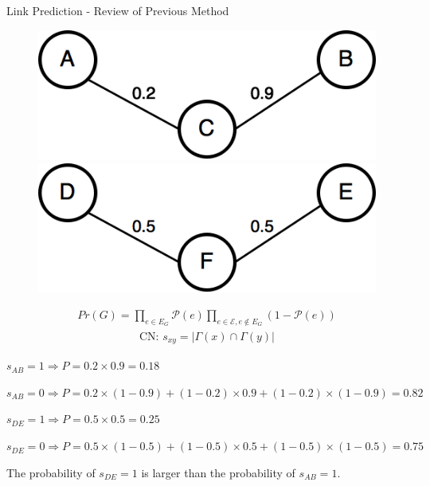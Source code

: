 \documentclass[9pt]{beamer}
\begin{document}
\begin{frame}{Link Prediction - Review of Previous Method}
\begin{figure}
\includegraphics[scale = 0.23]{common_neighbor_2.png}
\hspace{1cm}
\includegraphics[scale = 0.23]{common_neighbor_1.png}
\centering
\end{figure}
\begin{align*}
Pr(G) = \prod_{e\in E_G}\mathcal{P}(e)\prod_{e\in \mathcal{E}, e\notin E_G}(1-\mathcal{P}(e))
\end{align*}
\begin{align*}
\text{CN: }s_{xy}=|\Gamma(x)\cap\Gamma(y)|
\end{align*}

$s_{AB}=1 \Rightarrow P=0.2\times 0.9=0.18$ 

$s_{AB}=0 \Rightarrow P=0.2\times(1-0.9)+(1-0.2)\times0.9+(1-0.2)\times(1-0.9)=0.82$

$s_{DE}=1 \Rightarrow P=0.5\times 0.5=0.25$ 

$s_{DE}=0 \Rightarrow P=0.5\times(1-0.5)+(1-0.5)\times0.5+(1-0.5)\times(1-0.5)=0.75$

The probability of $s_{DE}=1$ is larger than the probability of $s_{AB}=1$. 
\end{frame}
\end{document}
